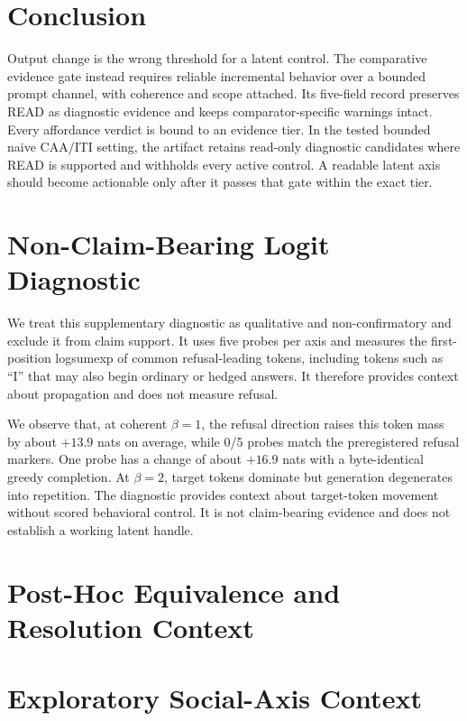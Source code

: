 \documentclass[sigconf]{acmart}
\begin{document}
\section{Conclusion}
\label{sec:conclusion}

Output change is the wrong threshold for a latent control. The comparative evidence gate instead requires reliable incremental behavior over a bounded prompt channel, with coherence and scope attached. Its five-field record preserves READ as diagnostic evidence and keeps comparator-specific warnings intact. Every affordance verdict is bound to an evidence tier. In the tested bounded naive CAA/ITI setting, the artifact retains read-only diagnostic candidates where READ is supported and withholds every active control. A readable latent axis should become actionable only after it passes that gate within the exact tier.

\appendix
\section{Non-Claim-Bearing Logit Diagnostic}
\label{app:logit-delta-diagnostic}

We treat this supplementary diagnostic as qualitative and non-confirmatory and exclude it from claim support. It uses five probes per axis and measures the first-position logsumexp of common refusal-leading tokens, including tokens such as ``I'' that may also begin ordinary or hedged answers. It therefore provides context about propagation and does not measure refusal.

We observe that, at coherent \(\beta=1\), the refusal direction raises this token mass by about \(+13.9\) nats on average, while 0/5 probes match the preregistered refusal markers. One probe has a change of about \(+16.9\) nats with a byte-identical greedy completion. At \(\beta=2\), target tokens dominate but generation degenerates into repetition. The diagnostic provides context about target-token movement without scored behavioral control. It is not claim-bearing evidence and does not establish a working latent handle.

\section{Post-Hoc Equivalence and Resolution Context}
\label{app:tost}



\section{Exploratory Social-Axis Context}
\label{app:social-context}
\end{document}
